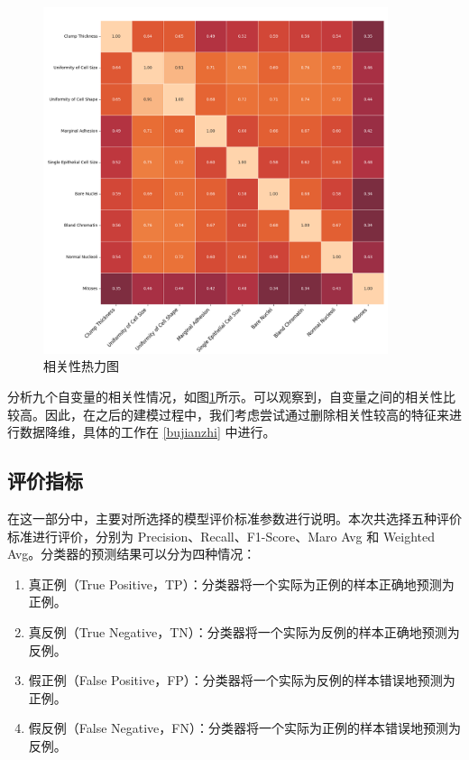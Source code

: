 \documentclass[a4paper,12pt,onecolumn,oneside]{article}
\begin{document}
\begin{figure}[H]
	\centering
	\includegraphics[width=0.9\textwidth]{res3/heatmap.png}
	\caption{相关性热力图}
	\label{fig:heatmap}
\end{figure}
分析九个自变量的相关性情况，如图\ref{fig:heatmap}所示。可以观察到，自变量之间的相关性比较高。因此，在之后的建模过程中，我们考虑尝试通过删除相关性较高的特征来进行数据降维，具体的工作在 \ref{bujianzhi} 中进行。
\subsection{评价指标}
在这一部分中，主要对所选择的模型评价标准参数进行说明。本次共选择五种评价标准进行评价，分别为 Precision、Recall、F1-Score、Maro Avg 和 Weighted Avg。分类器的预测结果可以分为四种情况：
\begin{enumerate}
	\item 真正例（True Positive，TP）：分类器将一个实际为正例的样本正确地预测为正例。
	\item 真反例（True Negative，TN）：分类器将一个实际为反例的样本正确地预测为反例。
	\item 假正例（False Positive，FP）：分类器将一个实际为反例的样本错误地预测为正例。
	\item 假反例（False Negative，FN）：分类器将一个实际为正例的样本错误地预测为反例。
\end{enumerate}
\end{document}
